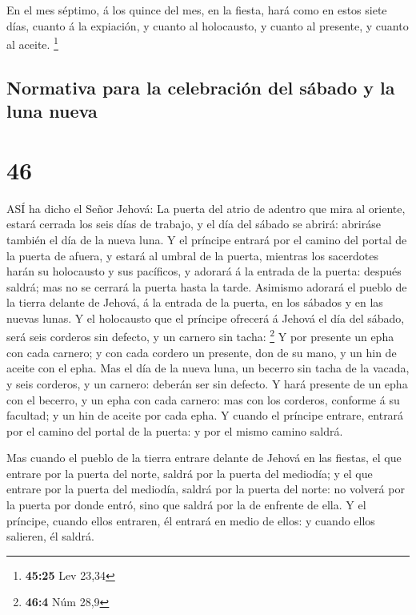  En el mes séptimo, á los quince del mes, en la fiesta,
hará como en estos siete días, cuanto á la expiación, y cuanto al
holocausto, y cuanto al presente, y cuanto al aceite. \footnote{\textbf{45:25}
  Lev 23,34}

\hypertarget{normativa-para-la-celebraciuxf3n-del-suxe1bado-y-la-luna-nueva}{%
\subsection{Normativa para la celebración del sábado y la luna
nueva}\label{normativa-para-la-celebraciuxf3n-del-suxe1bado-y-la-luna-nueva}}

\hypertarget{section-45}{%
\section{46}\label{section-45}}

 ASÍ ha dicho el Señor Jehová: La puerta del atrio de
adentro que mira al oriente, estará cerrada los seis días de trabajo, y
el día del sábado se abrirá: abriráse también el día de la nueva luna.
 Y el príncipe entrará por el camino del portal de la puerta
de afuera, y estará al umbral de la puerta, mientras los sacerdotes
harán su holocausto y sus pacíficos, y adorará á la entrada de la
puerta: después saldrá; mas no se cerrará la puerta hasta la tarde.
 Asimismo adorará el pueblo de la tierra delante de Jehová,
á la entrada de la puerta, en los sábados y en las nuevas lunas.
 Y el holocausto que el príncipe ofrecerá á Jehová el día
del sábado, será seis corderos sin defecto, y un carnero sin tacha:
\footnote{\textbf{46:4} Núm 28,9}  Y por presente un epha
con cada carnero; y con cada cordero un presente, don de su mano, y un
hin de aceite con el epha.  Mas el día de la nueva luna, un
becerro sin tacha de la vacada, y seis corderos, y un carnero: deberán
ser sin defecto.  Y hará presente de un epha con el becerro,
y un epha con cada carnero: mas con los corderos, conforme á su
facultad; y un hin de aceite por cada epha.  Y cuando el
príncipe entrare, entrará por el camino del portal de la puerta: y por
el mismo camino saldrá.

 Mas cuando el pueblo de la tierra entrare delante de Jehová
en las fiestas, el que entrare por la puerta del norte, saldrá por la
puerta del mediodía; y el que entrare por la puerta del mediodía, saldrá
por la puerta del norte: no volverá por la puerta por donde entró, sino
que saldrá por la de enfrente de ella.  Y el príncipe,
cuando ellos entraren, él entrará en medio de ellos: y cuando ellos
salieren, él saldrá.

